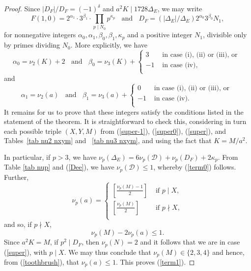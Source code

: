 \documentclass[11pt]{report}
\theoremstyle{definition}
\begin{document}
\begin{proof}
Since $|D_F|/D_F = (-1)^\delta$ and $a^2 K \mid 1728 \Delta_E$, we may write
$$
F(1,0) = 2^{\alpha_1} \cdot 3^{\beta_1} \cdot \prod_{p \mid N_0} p^{\kappa_p}
\; \; \mbox{ and } \; \; D_F = (|\Delta_E|/\Delta_E) 2^{\alpha_0} 3^{\beta_0} N_1,
$$
for nonnegative integers $\alpha_0, \alpha_1, \beta_0, \beta_1, \kappa_p$ and a positive integer $N_1$,  divisible only by primes dividing $N_0$. More explicitly, we have
$$
\alpha_0 = \nu_2 (K) + 2\; \; \mbox{ and } \;  \; \beta_0 =\nu_3 (K) +
\left\{
\begin{array}{rl}
3 & \mbox{ in case (i), (ii) or (iii), or } \\
-1& \mbox{ in case (iv),} \\
\end{array}
\right.
$$
and
$$
\alpha_1 = \nu_2 (a) \; \; \mbox{ and } \;  \; \beta_1 =\nu_3 (a) +
\left\{
\begin{array}{rl}
0 & \mbox{ in case (i), (ii) or (iii), or } \\
-1& \mbox{ in case (iv). } \\
\end{array}
\right.
$$
It remains for us to prove that these integers satisfy the conditions listed in the statement of the theorem. It is straightforward to check this,  considering in turn each possible triple $(X,Y,M)$ from
(\ref{super-1}), (\ref{super0}), (\ref{super}), and Tables~\ref{tab nu2 nxym} and ~\ref{tab nu3 nxym}, and using the fact that $K = M/a^2$.

In particular, if $p > 3$, we have $\nu_p(\Delta_E) = 6 \nu_p(\mathcal{D}) + \nu_p (D_F) + 2 \kappa_p$. From Table \ref{tab nup} and (\ref{Dee}), we have $\nu_p(\mathcal{D}) \leq 1$, whereby (\ref{term0}) follows.
Further,
\begin{equation} \label{toothbrush}
\nu_p(a) =
\left\{\begin{array}{ll}
\left[ \frac{\nu_p(M)-1}{2} \right] & \mbox{ if } p \mid X, \\
\left[ \frac{\nu_p(M)}{2} \right] & \mbox{ if } p \nmid X, \\
\end{array}
\right.
\end{equation}
and so, if $p \nmid X$,
$$
\nu_p(M)-2 \nu_p(a) \leq 1.
$$
Since $a^2K=M$, if $p^2 \mid D_F$, then $\nu_p(N)=2$ and it follows that we are in case (\ref{super}), with $p \mid X$. We may thus conclude that $\nu_p (M) \in \{ 2, 3, 4 \}$ and hence, from (\ref{toothbrush}), that $\nu_p(a) \leq 1$. This proves (\ref{term1}).


\end{proof}
\end{document}
